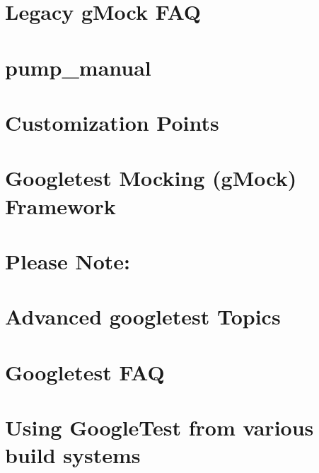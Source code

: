 \let\mypdfximage\pdfximage\def\pdfximage{\immediate\mypdfximage}\documentclass[twoside]{book}
\newcommand{\+}{\discretionary{\mbox{\scriptsize$\hookleftarrow$}}{}{}}
\begin{document}
\chapter{Legacy g\+Mock F\+AQ}
\label{_g_mock_faq}

\chapter{pump\+\_\+manual}
\label{md_lib_googletest-master_googlemock_docs_pump_manual}

\chapter{Customization Points}
\label{md_lib_googletest-master_googlemock_include_gmock_internal_custom__r_e_a_d_m_e}

\chapter{Googletest Mocking (g\+Mock) Framework}
\label{md_lib_googletest-master_googlemock__r_e_a_d_m_e}

\chapter{Please Note\+:}
\label{md_lib_googletest-master_googlemock_scripts__r_e_a_d_m_e}

\chapter{Advanced googletest Topics}
\label{md_lib_googletest-master_googletest_docs_advanced}

\chapter{Googletest F\+AQ}
\label{md_lib_googletest-master_googletest_docs_faq}

\chapter{Using Google\+Test from various build systems}
\label{md_lib_googletest-master_googletest_docs_pkgconfig}

\end{document}
